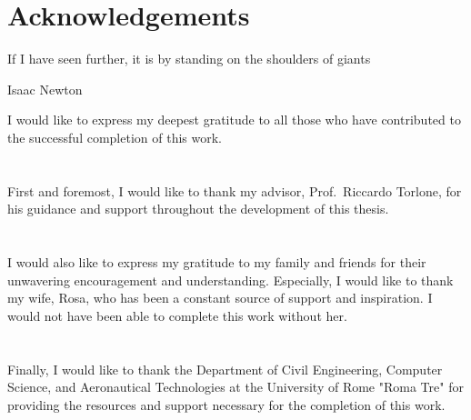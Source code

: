 
\chapter*{Acknowledgements}
\label{ch:acknowledgements}
\epigraph{If I have seen further, it is by standing on the shoulders of giants}{Isaac Newton}

\noindent I would like to express my deepest gratitude to all those who have contributed to the successful completion of this work.\\
\\
\\
First and foremost, I would like to thank my advisor, Prof.\ Riccardo Torlone, for his guidance and support throughout the development of this thesis.\\
\\
\\
I would also like to express my gratitude to my family and friends for their unwavering encouragement and understanding.
Especially, I would like to thank my wife, Rosa, who has been a constant source of support and inspiration.
I would not have been able to complete this work without her.\\
\\
\\
Finally, I would like to thank the Department of Civil Engineering, Computer Science, and Aeronautical Technologies at the University of Rome "Roma Tre" for providing the resources and support necessary for the completion of this work.

\thispagestyle{fancy}
\fancyhf{}
\renewcommand{\headrulewidth}{0pt} %
